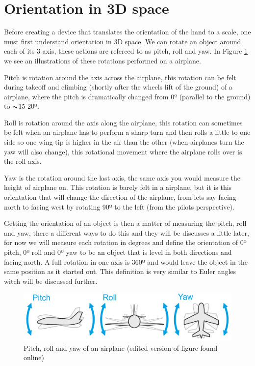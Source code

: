 \section{Orientation in 3D space}
Before creating a device that translates the orientation of the hand to a scale, one must first understand orientation in 3D space. We can rotate an object around each of its 3 axis, these actions are refereed to as pitch, roll and yaw. In Figure \ref{plane} we see an illustrations of these rotations performed on a airplane.

Pitch is rotation around the axis across the airplane, this rotation can be felt during takeoff and climbing (shortly after the wheels lift of the ground) of a airplane, where the pitch is dramatically changed from 0º (parallel to the ground) to $\thicksim$15-20º\cite{takeoff}.

Roll is rotation around the axis along the airplane, this rotation can sometimes be felt when an airplane has to perform a sharp turn and then rolls a little to one side so one wing tip is higher in the air than the other (when airplanes turn the yaw will also change), this rotational movement where the airplane rolls over is the roll axis.

Yaw is the rotation around the last axis, the same axis you would measure the height of airplane on. This rotation is barely felt in a airplane, but it is this orientation that will change the direction of the airplane, from lets say facing north to facing west by rotating 90º to the left (from the pilots perspective).

Getting the orientation of an object is then a matter of measuring the pitch, roll and yaw, there a different ways to do this and they will be discusses a little later, for now we will measure each rotation in degrees and define the orientation of 0º pitch, 0º roll and 0º yaw to be an object that is level in both directions and facing north. A full rotation in one axis is 360º and would leave the object in the same position as it started out. This definition is very similar to Euler angles witch will be discussed further.

\begin{figure}[h!]
    \centering
    \includegraphics[width=1\textwidth]{figures/pitch_rool_yaw_v2.png}
    \caption{Pitch, roll and yaw of an airplane (edited version of figure found online\cite{plane})}
    \label{plane}
\end{figure}

